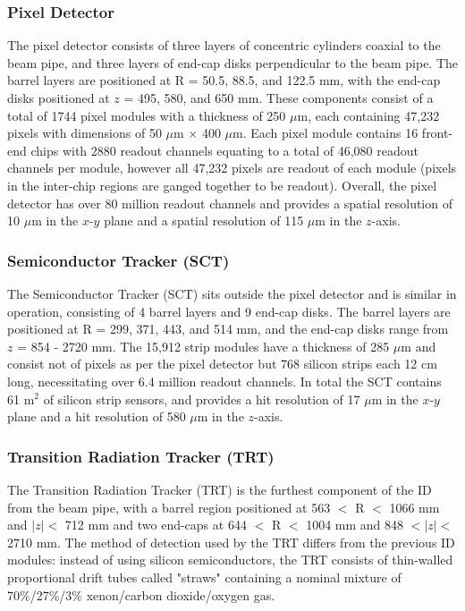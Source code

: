 \documentclass[12pt,a4paper,epsf,portrait,times,epsfig]{report}
\begin{document}
		\subsubsection{Pixel Detector}\label{Section:PixelDetector}

		The pixel detector consists of three layers of concentric cylinders coaxial to the beam pipe, and three layers of end-cap disks perpendicular to the beam pipe. The barrel layers are positioned at R = 50.5, 88.5, and 122.5 mm, with the end-cap disks positioned at $z$ = 495, 580, and 650 mm. These components consist of a total of 1744 pixel modules \cite{ATLASPixel} with a thickness of 250 $\mu$m, each containing 47,232 pixels with dimensions of 50 $\mu$m $\times$ 400 $\mu$m. Each pixel module contains 16 front-end chips with 2880 readout channels equating to a total of 46,080 readout channels per module, however all 47,232 pixels are readout of each module (pixels in the inter-chip regions are ganged together to be readout). Overall, the pixel detector has over 80 million readout channels and provides a spatial resolution of 10 $\mu$m in the $x$-$y$ plane and a spatial resolution of 115 $\mu$m in the $z$-axis. 


		\subsubsection{Semiconductor Tracker (SCT)}\label{Section:SCT}

		The Semiconductor Tracker (SCT) \cite{ATLASSCT} sits outside the pixel detector and is similar in operation, consisting of 4 barrel layers and 9 end-cap disks. The barrel layers are positioned at R = 299, 371, 443, and 514 mm, and the end-cap disks range from $z$ = 854 - 2720 mm. The 15,912 strip modules have a thickness of 285 $\mu$m and consist not of pixels as per the pixel detector but 768 silicon strips each 12 cm long, necessitating over 6.4 million readout channels. In total the SCT contains 61 m$^{2}$ of silicon strip sensors, and provides a hit resolution of 17 $\mu$m in the $x$-$y$ plane and a hit resolution of 580 $\mu$m in the $z$-axis. 

		\subsubsection{Transition Radiation Tracker (TRT)}\label{Section:TRT} 

		The Transition Radiation Tracker (TRT) \cite{ATLASTRT} is the furthest component of the ID from the beam pipe, with a barrel region positioned at 563 $<$ R $<$ 1066 mm and $|z| <$ 712 mm and two end-caps at 644 $<$ R $<$ 1004 mm and 848 $< |z| <$ 2710 mm. The method of detection used by the TRT differs from the previous ID modules: instead of using silicon semiconductors, the TRT consists of thin-walled proportional drift tubes called "straws" containing a nominal mixture of 70\%/27\%/3\% xenon/carbon dioxide/oxygen gas. \par 
\end{document}
